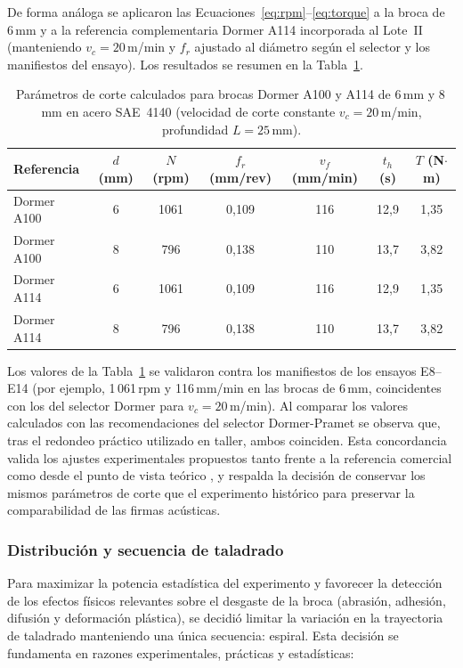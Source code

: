 \documentclass[12pt, letterpaper]{report}
\begin{document}
De forma análoga se aplicaron las Ecuaciones~\eqref{eq:rpm}--\eqref{eq:torque} a la broca de 6\,mm y a la referencia complementaria Dormer A114 incorporada al Lote~II (manteniendo $v_c = 20$\,m/min y $f_r$ ajustado al diámetro según el selector y los manifiestos del ensayo). Los resultados se resumen en la Tabla~\ref{tab:params-corte-cap4}.

\begin{table}[htbp]
\centering
\small
\caption{Par\'{a}metros de corte calculados para brocas Dormer A100 y A114 de 6\,mm y 8\,mm en acero SAE~4140 (velocidad de corte constante $v_c = 20$\,m/min, profundidad $L = 25$\,mm).}
\label{tab:params-corte-cap4}
\begin{tabularx}{\textwidth}{l c c c c c c}
\toprule
Referencia & $d$ (mm) & $N$ (rpm) & $f_r$ (mm/rev) & $v_f$ (mm/min) & $t_h$ (s) & $T$ (N$\cdot$m) \\
\midrule
Dormer A100 & 6 & 1061 & 0{,}109 & 116 & 12{,}9 & 1{,}35 \\
Dormer A100 & 8 & 796  & 0{,}138 & 110 & 13{,}7 & 3{,}82 \\
Dormer A114 & 6 & 1061 & 0{,}109 & 116 & 12{,}9 & 1{,}35 \\
Dormer A114 & 8 & 796  & 0{,}138 & 110 & 13{,}7 & 3{,}82 \\
\bottomrule
\end{tabularx}
\end{table}

Los valores de la Tabla~\ref{tab:params-corte-cap4} se validaron contra los manifiestos de los ensayos E8--E14 (por ejemplo, 1\,061\,rpm y 116\,mm/min en las brocas de 6\,mm, coincidentes con los del selector Dormer para $v_c = 20$\,m/min). Al comparar los valores calculados con las recomendaciones del selector Dormer-Pramet se observa que, tras el redondeo práctico utilizado en taller, ambos coinciden. Esta concordancia valida los ajustes experimentales propuestos tanto frente a la referencia comercial como desde el punto de vista teórico \cite{groover2007}, y respalda la decisión de conservar los mismos parámetros de corte que el experimento histórico para preservar la comparabilidad de las firmas acústicas.

\subsubsection{Distribución y secuencia de taladrado}

Para maximizar la potencia estadística del experimento y favorecer la detección de los efectos físicos relevantes sobre el desgaste de la broca (abrasión, adhesión, difusión y deformación plástica), se decidió limitar la variación en la trayectoria de taladrado manteniendo una única secuencia: espiral. Esta decisión se fundamenta en razones experimentales, prácticas y estadísticas:
\end{document}
